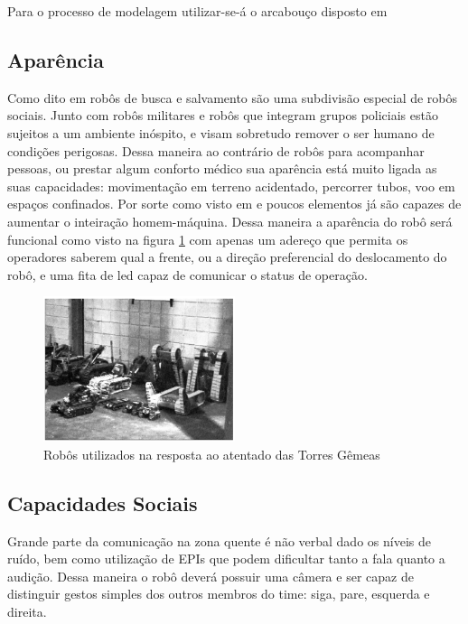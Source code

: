 \documentclass[
	article,			%
	11pt,				%
	oneside,			%
	a4paper,			%
	english,			%
	brazil,				%
	sumario=tradicional	
	]{abntex2}
\begin{document}
Para o processo de modelagem utilizar-se-á o arcabouço disposto em \cite{baraka2020}

\subsection{Aparência}

Como dito em \cite{Robin2004} robôs de busca e salvamento são uma subdivisão especial de robôs sociais. Junto com robôs militares e robôs que integram grupos policiais estão sujeitos a um ambiente inóspito, e visam sobretudo remover o ser humano de condições perigosas. Dessa maneira ao contrário de robôs para acompanhar pessoas, ou prestar algum conforto médico sua aparência está muito ligada as suas capacidades: movimentação em terreno acidentado, percorrer tubos, voo em espaços confinados. Por sorte como visto em \cite{akgun2022using} e \cite{fin2004} poucos elementos já são capazes de aumentar o inteiração homem-máquina. Dessa maneira a aparência do robô será funcional como visto na figura \ref{figure:robo_wotc} com apenas um adereço que permita os operadores saberem qual a frente, ou a direção preferencial do deslocamento do robô, e uma fita de led capaz de comunicar o status de operação.

\begin{figure}
\centering
\includegraphics[width=0.5\textwidth]{robo-wotc.png} 
\caption{Robôs utilizados na resposta ao atentado das Torres Gêmeas }
\label{figure:robo_wotc}
\end{figure}

\subsection{Capacidades Sociais}

Grande parte da comunicação na zona quente é não verbal dado os níveis de ruído, bem como utilização de EPIs que podem dificultar tanto a fala quanto a audição. Dessa maneira o robô deverá possuir uma câmera e ser capaz de distinguir gestos simples dos outros membros do time: siga, pare, esquerda e direita.
\end{document}
